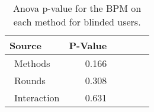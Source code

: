 
\begin{table}[!htb]
\centering
\caption{Anova p-value for the BPM on each method for blinded users.}
\label{tab:blocanova_bpm_two_way_sight}
\begin{tabular}{lrrrrr}
\toprule
          Source & P-Value \\
\midrule
    \    Methods &   0.166 \\
     \    Rounds &   0.308 \\
\    Interaction &   0.631 \\
\bottomrule
\end{tabular}
\end{table}

